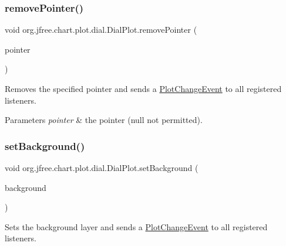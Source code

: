 \subsubsection{\texorpdfstring{remove\+Pointer()}{removePointer()}\hspace{0.1cm}{\footnotesize\ttfamily [2/2]}}
{\footnotesize\ttfamily void org.\+jfree.\+chart.\+plot.\+dial.\+Dial\+Plot.\+remove\+Pointer (\begin{DoxyParamCaption}\item[{\mbox{\hyperlink{classorg_1_1jfree_1_1chart_1_1plot_1_1dial_1_1_dial_pointer}{Dial\+Pointer}}}]{pointer }\end{DoxyParamCaption})}

Removes the specified pointer and sends a \mbox{\hyperlink{}{Plot\+Change\+Event}} to all registered listeners.


\begin{DoxyParams}{Parameters}
{\em pointer} & the pointer ({\ttfamily null} not permitted). \\
\hline
\end{DoxyParams}
\mbox{\label{classorg_1_1jfree_1_1chart_1_1plot_1_1dial_1_1_dial_plot_a0b16b2d5119b933d96683c5737fca45d}} 
\subsubsection{\texorpdfstring{set\+Background()}{setBackground()}}
{\footnotesize\ttfamily void org.\+jfree.\+chart.\+plot.\+dial.\+Dial\+Plot.\+set\+Background (\begin{DoxyParamCaption}\item[{\mbox{\hyperlink{interfaceorg_1_1jfree_1_1chart_1_1plot_1_1dial_1_1_dial_layer}{Dial\+Layer}}}]{background }\end{DoxyParamCaption})}

Sets the background layer and sends a \mbox{\hyperlink{}{Plot\+Change\+Event}} to all registered listeners.



